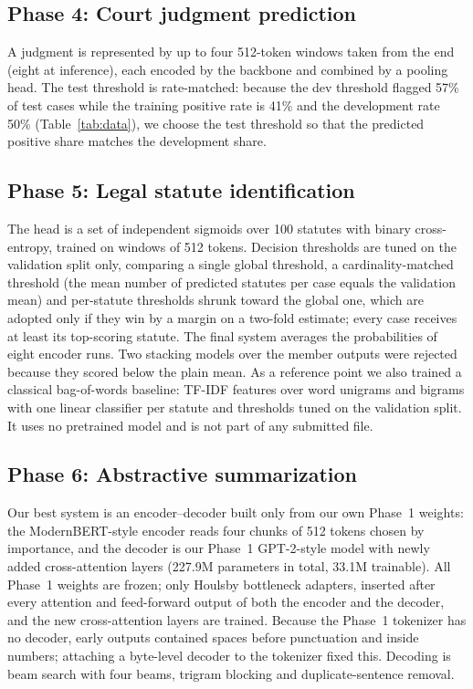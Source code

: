 \documentclass[10pt,a4paper]{article}
\begin{document}
\subsection{Phase 4: Court judgment prediction}
A judgment is represented by up to four 512-token windows taken from the end (eight at inference), each encoded by the backbone and combined by a pooling head. The test threshold is rate-matched: because the dev threshold flagged 57\% of test cases while the training positive rate is 41\% and the development rate 50\% (Table~\ref{tab:data}), we choose the test threshold so that the predicted positive share matches the development share.

\subsection{Phase 5: Legal statute identification}
The head is a set of independent sigmoids over 100 statutes with binary cross-entropy, trained on windows of 512 tokens. Decision thresholds are tuned on the validation split only, comparing a single global threshold, a cardinality-matched threshold (the mean number of predicted statutes per case equals the validation mean) and per-statute thresholds shrunk toward the global one, which are adopted only if they win by a margin on a two-fold estimate; every case receives at least its top-scoring statute. The final system averages the probabilities of eight encoder runs. Two stacking models over the member outputs were rejected because they scored below the plain mean. As a reference point we also trained a classical bag-of-words baseline: TF-IDF features over word unigrams and bigrams with one linear classifier per statute and thresholds tuned on the validation split. It uses no pretrained model and is not part of any submitted file.

\subsection{Phase 6: Abstractive summarization}\label{sec:p6}
Our best system is an encoder--decoder built only from our own Phase~1 weights: the ModernBERT-style encoder reads four chunks of 512 tokens chosen by importance, and the decoder is our Phase~1 GPT-2-style model with newly added cross-attention layers (227.9M parameters in total, 33.1M trainable). All Phase~1 weights are frozen; only Houlsby bottleneck adapters, inserted after every attention and feed-forward output of both the encoder and the decoder, and the new cross-attention layers are trained. Because the Phase~1 tokenizer has no decoder, early outputs contained spaces before punctuation and inside numbers; attaching a byte-level decoder to the tokenizer fixed this. Decoding is beam search with four beams, trigram blocking and duplicate-sentence removal.
\end{document}
